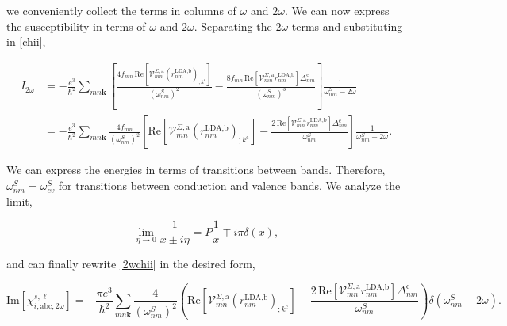 \documentclass[10pt]{article}
\begin{document}
we conveniently collect the terms in columns of $\omega$ and $2\omega$. We can now express the susceptibility in terms of $\omega$ and $2\omega$. Separating the $2\omega$ terms and substituting in \eqref{chii}, %

\begin{align}\label{2wchii}
I_{2\omega}
&= -\frac{e^{3}}{\hbar^2}\sum_{mn\mathbf{k}}\left[\frac{4f_{mn}\,\mathrm{Re}\left[\mathcal{V}^{\Sigma,\text{a}}_{mn}\left(r^{\text{LDA,b}}_{nm}\right)_{;k^{\text{c}}}\right]}{(\omega^{S}_{nm})^{2}} - \frac{8f_{mn}\,\mathrm{Re}\left[\mathcal{V}^{\Sigma,\text{a}}_{mn}r^{\text{LDA,b}}_{nm}\right]\Delta^{\text{c}}_{nm}}{(\omega^{S}_{nm})^{3}}\right]\frac{1}{\omega^{S}_{nm}-2\omega}\nonumber\\
&= -\frac{e^3}{\hbar^2}\sum_{mn\mathbf{k}}\frac{4f_{mn}}{(\omega^{S}_{nm})^{2}}\left[\mathrm{Re}\left[\mathcal{V}^{\Sigma,\text{a}}_{mn}\left(r^{\text{LDA,b}}_{nm}\right)_{;k^{\text{c}}}\right] - \frac{2\,\mathrm{Re}\left[\mathcal{V}^{\Sigma,\text{a}}_{mn}r^{\text{LDA,b}}_{nm}\right]\Delta^{\text{c}}_{nm}}{\omega^{S}_{nm}}\right]\frac{1}{\omega^{S}_{nm}-2\omega}.
\end{align}

We can express the energies in terms of transitions between bands. Therefore, $\omega^{S}_{nm} = \omega^{S}_{cv}$ for transitions between conduction and valence bands. We analyze the limit,

\begin{equation}
\lim_{\eta\to 0}\frac{1}{x\pm i\eta}=P\frac{1}{x}\mp i\pi\delta(x),
\end{equation}

and can finally rewrite \eqref{2wchii} in the desired form,

\begin{equation}\label{imchi2w}
\mathrm{Im}[\chi_{i,\text{a}\text{b}\text{c},2\omega}^{s,\ell}] = -\frac{\pi e^{3}}{\hbar^2}\sum_{mn\mathbf{k}}\frac{4}{(\omega^{S}_{nm})^{2}}\left(\mathrm{Re}\left[\mathcal{V}^{\Sigma,\text{a}}_{mn}\left(r^{\text{LDA,b}}_{nm}\right)_{;k^{\text{c}}}\right] - \frac{2\,\mathrm{Re}\left[\mathcal{V}^{\Sigma,\text{a}}_{mn}r^{\text{LDA,b}}_{nm}\right]\Delta^{\text{c}}_{nm}}{\omega^{S}_{nm}}\right)\delta(\omega^{S}_{nm}-2\omega).
\end{equation}
\end{document}
